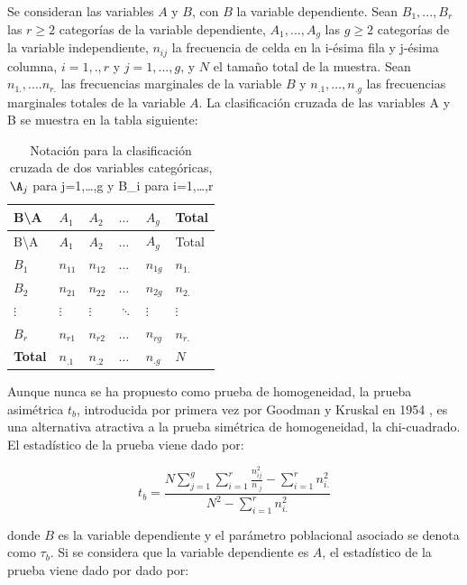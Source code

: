 \documentclass[12pt,a4paper,]{book}
\numberwithin{dummy}{section}
\theoremstyle{ocrenumbox}
\theoremstyle{blacknumex}
\theoremstyle{blacknumbox}
\theoremstyle{ocrenum}
\theoremstyle{ocrenum}
\begin{document}
Se consideran las variables \(A\) y \(B\), con \(B\) la variable
dependiente. Sean \(B_1, . . . ,B_r\) las \(r\ge 2\) categorías de la
variable dependiente, \(A_1, . . . , A_g\) las \(g \ge 2\) categorías de
la variable independiente, \(n_{ij}\) la frecuencia de celda en la
i-ésima fila y j-ésima columna, \(i = 1, . , r\) y \(j = 1, . . . , g\),
y \(N\) el tamaño total de la muestra. Sean \(n_{1.}, . . . . n_{r.}\)
las frecuencias marginales de la variable \(B\) y \(n_{.1}, … , n_{.g}\)
las frecuencias marginales totales de la variable \(A\). La
clasificación cruzada de las variables A y B se muestra en la tabla
siguiente:

\begin{longtable}[]{@{}llllll@{}}
\caption{Notación para la clasificación cruzada de dos variables
categóricas, \(\A_j\) para j=1,\ldots,g y B\_i para
i=1,\ldots,r}\tabularnewline
\toprule
B\textbackslash A & \(A_1\) & \(A_2\) & \(\dots\) & \(A_g\) & Total \\
\midrule
\endfirsthead
\toprule
B\textbackslash A & \(A_1\) & \(A_2\) & \(\dots\) & \(A_g\) & Total \\
\midrule
\endhead
\(B_1\) & \(n_{11}\) & \(n_{12}\) & \(\dots\) & \(n_{1g}\) &
\(n_{1.}\) \\
\(B_2\) & \(n_{21}\) & \(n_{22}\) & \(\dots\) & \(n_{2g}\) &
\(n_{2.}\) \\
\(\vdots\) & \(\vdots\) & \(\vdots\) & \(\ddots\) & \(\vdots\) &
\(\vdots\) \\
\(B_r\) & \(n_{r1}\) & \(n_{r2}\) & \(\dots\) & \(n_{rg}\) &
\(n_{r.}\) \\
\textbf{Total} & \(n_{.1}\) & \(n_{.2}\) & \(\dots\) & \(n_{.g}\) &
\(N\) \\
\bottomrule
\end{longtable}

Aunque nunca se ha propuesto como prueba de homogeneidad, la prueba
asimétrica \(t_b\), introducida por primera vez por Goodman y Kruskal en
1954 \citep{Goodman1954}, es una alternativa atractiva a la prueba
simétrica de homogeneidad, la chi-cuadrado. El estadístico de la prueba
viene dado por:

\[
t_b=\frac{N\displaystyle\sum_{j=1}^g\displaystyle\sum_{i=1}^r\frac{n^2_{ij}}{n_{.j}}-\displaystyle\sum_{i=1}^rn^2_{i.}}{N^2-\displaystyle\sum_{i=1}^rn^2_{i.}}
\]

donde \(B\) es la variable dependiente y el parámetro poblacional
asociado se denota como \(\tau_b\). Si se considera que la variable
dependiente es \(A\), el estadístico de la prueba viene dado por dado
por:
\end{document}
